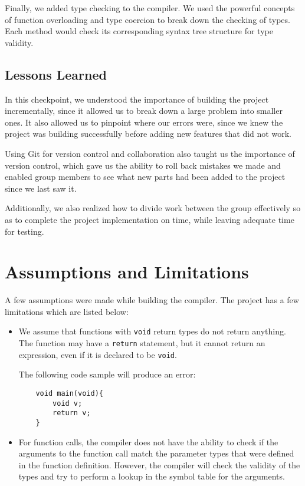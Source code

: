 \documentclass[12pt, letterpaper]{article}
\begin{document}
Finally, we added type checking to the compiler. We used the powerful concepts of function overloading and type coercion to break down the checking of types. Each method would check its corresponding syntax tree structure for type validity.
 
\subsection{Lessons Learned}
In this checkpoint, we understood the importance of building the project incrementally, since it allowed us to break down a large problem into smaller ones. It also allowed us to pinpoint where our errors were, since we knew the project was building successfully before adding new features that did not work.

Using Git for version control and collaboration also taught us the importance of version control, which gave us the ability to roll back mistakes we made and enabled group members to see what new parts had been added to the project since we last saw it.

Additionally, we also realized how to divide work between the group effectively so as to complete the project implementation on time, while leaving adequate time for testing.

\section{Assumptions and Limitations}
A few assumptions were made while building the compiler. The project has a few limitations which are listed below:
\begin{itemize}
\item We assume that functions with \texttt{void} return types do not return anything. The function may have a \texttt{return} statement, but it cannot return an expression, even if it is declared to be \texttt{void}. 

The following code sample will produce an error:
\begin{lstlisting}
	void main(void){
		void v;
		return v;
	}
\end{lstlisting}

\item For function calls, the compiler does not have the ability to check if the arguments to the function call match the parameter types that were defined in the function definition. However, the compiler will check the validity of the types and try to perform a lookup in the symbol table for the arguments.
\end{itemize}
\end{document}
